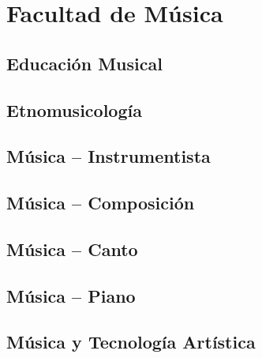 \section{Facultad de Música}

\subsection{Educación Musical}

\subsection{Etnomusicología}

\subsection{Música -- Instrumentista}

\subsection{Música -- Composición}

\subsection{Música -- Canto}

\subsection{Música -- Piano}

\subsection{Música y Tecnología Artística}
\sincodigo
